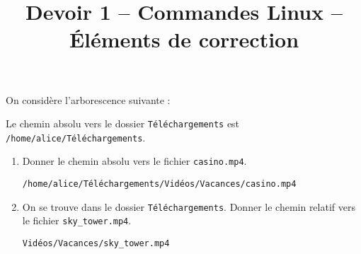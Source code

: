 \documentclass[a4paper,dvipsnames]{article}
\title{Devoir 1 -- Commandes Linux -- Éléments de correction}
\author{}
\date{}
\newenvironment{correction}{\color{blue}}{}
\begin{document}
\renewcommand{\contentsname}{}

\pagestyle{fancy}

\begin{tcolorbox}[colframe=blue!75, colback=blue!45, valign=center, height=1.5cm, top=5mm]
  \maketitle
\end{tcolorbox}


\vspace{1cm}

\thispagestyle{fancy}

\begin{exercice}{}{}
  On considère l'arborescence suivante :

  \bigskip


  \bigskip

  Le chemin absolu vers le dossier \texttt{Téléchargements} est \texttt{/home/alice/Téléchargements}.

  \begin{enumerate}
    \item Donner le chemin absolu vers le fichier \texttt{casino.mp4}.

      \begin{correction}
        \begin{center}
	  \texttt{/home/alice/Téléchargements/Vidéos/Vacances/casino.mp4}          
        \end{center}
      \end{correction}
      
    \item On se trouve dans le dossier \texttt{Téléchargements}. Donner le chemin relatif vers le fichier \texttt{sky_tower.mp4}.

      \begin{correction}
        \begin{center}
	  \texttt{Vidéos/Vacances/sky_tower.mp4} 
        \end{center}
      \end{correction}


\end{enumerate}
\end{exercice}
\end{document}
